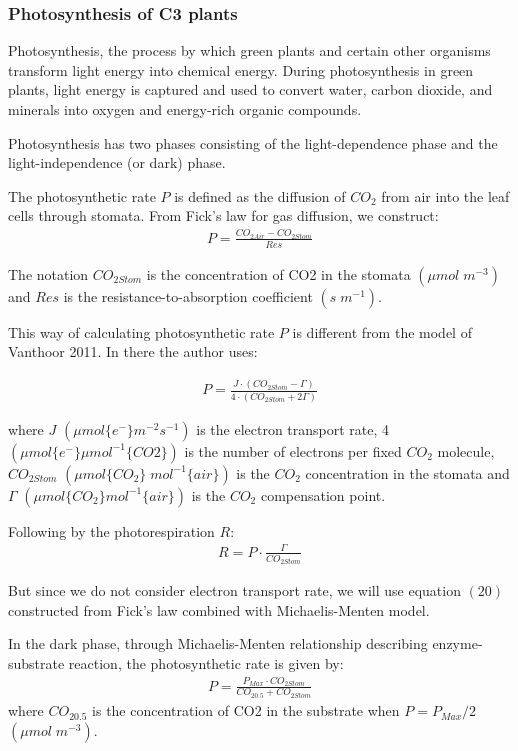 \documentclass[a4paper]{article}
\begin{document}


\subsubsection{Photosynthesis of C3 plants}
\setcounter{equation}{19}
Photosynthesis, the process by which green plants and certain other organisms transform light energy into chemical energy. During photosynthesis in green plants, light energy is captured and used to convert water, carbon dioxide, and minerals into oxygen and energy-rich organic compounds.

Photosynthesis has two phases consisting of the light-dependence phase and the light-independence (or dark) phase.

The photosynthetic rate \(P\) is defined as the diffusion of \(CO_2\) from air into the leaf cells through stomata. From Fick's law for gas diffusion, we construct:
\begin{gather}
  P = \frac{CO_{2Air} - CO_{2Stom}}{Res}
\end{gather}

The notation \(CO_{2Stom}\) is the concentration of CO2 in the stomata \((\mu mol\;m^{-3})\) and \(Res\) is the resistance-to-absorption coefficient \((s\;m^{-1})\).

This way of calculating photosynthetic rate \(P\) is different from the model of Vanthoor 2011. In there the author uses:

\begin{gather}
  P = \frac{J \cdot (CO_{2Stom} - \Gamma)}{4 \cdot (CO_{2Stom} + 2\Gamma)}
\end{gather}

where \(J\) \((\mu mol \{e^-\} m^{-2} s^{-1})\) is the electron transport rate, 4 \((\mu mol \{e^-\} \mu mol^{-1} \{CO2\})\) is the
number of electrons per fixed \(CO_2\) molecule, \(CO_{2Stom}\) \((\mu mol\{CO_2\}\;mol^{-1}\{air\})\) is the \(CO_2\) concentration in the stomata and \(\Gamma\) \((\mu mol \{CO_2\} mol^{-1} \{air\})\) is the \(CO_2\) compensation point.

Following by the photorespiration \(R\):
\begin{gather}
  R = P \cdot \frac{\Gamma}{CO_{2Stom}}
\end{gather}

But since we do not consider electron transport rate, we will use equation $(20)$ constructed from Fick's law combined with Michaelis-Menten model.

In the dark phase, through Michaelis-Menten relationship describing enzyme-substrate reaction, the photosynthetic rate is given by:
\begin{gather}
  P = \frac{P_{Max} \cdot CO_{2Stom}}{CO_{2 0.5} + CO_{2Stom}}
\end{gather}
where \(CO_{2 0.5}\) is the concentration of CO2 in the substrate when \(P = P_{Max}/2\) \((\mu mol\;m^{-3})\).
\end{document}
